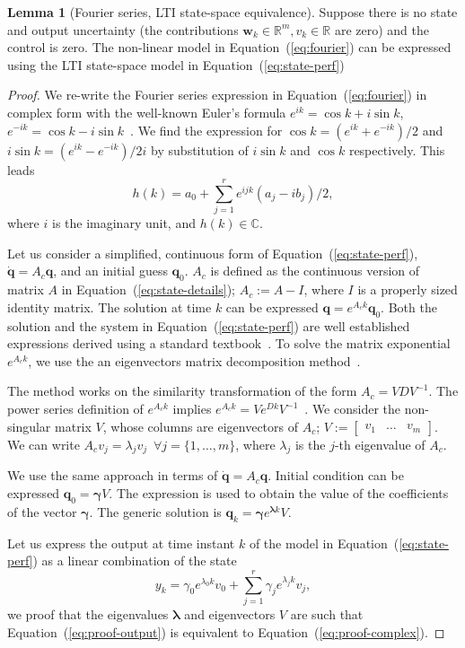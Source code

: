 \documentclass[letterpaper,10pt,conference]{ieeeconf}
\theoremstyle{definition}
\newtheorem{lem}[thm]{Lemma}
\begin{document}
\begin{lem}[Fourier series, LTI state-space equivalence]Suppose there is no state and output uncertainty (the contributions $\mathbf{w}_k\in\mathbb{R}^m,v_k\in\mathbb{R}$ are zero) and the control is zero. The non-linear model in Equation~(\ref{eq:fourier}) can be expressed using the LTI state-space model in Equation~(\ref{eq:state-perf})
\end{lem}
\begin{proof}
We re-write the Fourier series expression in Equation~(\ref{eq:fourier}) in complex form with the well-known Euler's formula $e^{ik}=\cos{k}+i\sin{k}$, $e^{-ik}=\cos{k}-i\sin{k}$~\cite{ogata2002modern}. We find the expression for $\cos{k}=(e^{ik}+e^{-ik})/2$ and $i\sin{k}=(e^{ik}-e^{-ik})/2i$ by substitution of $i\sin{k}$ and $\cos{k}$ respectively. This leads
  \begin{equation}\label{eq:proof-complex}
    h(k)=a_0+\sum_{j=1}^r{e^{ijk}(a_j-ib_j)/2},
  \end{equation}
where $i$ is the imaginary unit, and $h(k)\in\mathbb{C}$. 

Let us consider a simplified, continuous form of Equation~(\ref{eq:state-perf}), $\dot{\mathbf{q}}=A_c\mathbf{q}$, and an initial guess $\mathbf{q}_0$. $A_c$ is defined as the continuous version of matrix $A$ in Equation~(\ref{eq:state-details}); $A_c:=A-I$, where $I$ is a properly sized identity matrix. The solution at time $k$ can be expressed $\mathbf{q}=e^{A_ck}\mathbf{q}_0$. Both the solution and the system in Equation~(\ref{eq:state-perf}) are well established expressions derived using a standard textbook~\cite{kuo1967automatic}. To solve the matrix exponential $e^{A_ck}$, we use the an eigenvectors matrix decomposition method~\cite{moler2003nineteen}.

The method works on the similarity transformation of the form $A_c=VDV^{-1}$. The power series definition of $e^{A_ck}$ implies $e^{A_ck}=Ve^{Dk}V^{-1}$~\cite{moler2003nineteen}. We consider the non-singular matrix $V$, whose columns are eigenvectors of $A_c$; $V:=\begin{bmatrix}v_1 & \dots & v_m\end{bmatrix}$. We can write $A_cv_j=\lambda_jv_j\,\,\,\forall j=\{1,\dots,m\}$, where $\lambda_j$ is the $j$-th eigenvalue of $A_c$. 

We use the same approach in terms of $\dot{\mathbf{q}}=A_c\mathbf{q}$. Initial condition can be expressed $\mathbf{q}_0=\mathbf{\gamma}V$. The expression is used to obtain the value of the coefficients of the vector $\mathbf{\gamma}$. The generic solution is $\mathbf{q}_k=\mathbf{\gamma}e^{\mathbf{\lambda}k}V$.

Let us express the output at time instant $k$ of the model in Equation~(\ref{eq:state-perf}) as a linear combination of the state
\begin{equation}\label{eq:proof-output}
  y_k=\gamma_0e^{\lambda_0k}v_0+\sum_{j=1}^r{\gamma_je^{\lambda_jk}v_j},
\end{equation}
we proof that the eigenvalues $\mathbf{\lambda}$ and eigenvectors $V$ are such that Equation~(\ref{eq:proof-output}) is equivalent to Equation~(\ref{eq:proof-complex}).

\end{proof}
\end{document}
